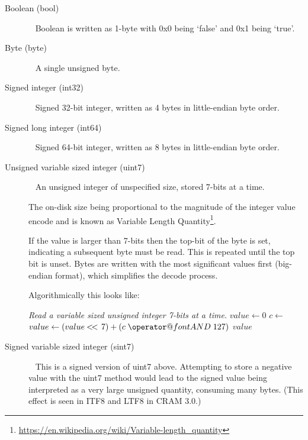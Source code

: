 \documentclass[a4paper]{article}
\makeatletter
\newcommand*{\bitand}{%
  \nonscript\mskip-\medmuskip\mkern5mu%
  \mathbin{\operator@font AND}\penalty900\mkern5mu%
  \nonscript\mskip-\medmuskip
}
\newcommand\shiftl{\mathbin{<\mkern-3mu<\,}}
\makeatother
\begin{document}
\begin{description}

\item[Boolean (bool)]\ \newline
Boolean is written as 1-byte with 0x0 being `false' and 0x1 being `true'.

\item[Byte (byte)]\ \newline
A single unsigned byte.

\item[Signed integer (int32)]\ \newline
Signed 32-bit integer, written as 4 bytes in little-endian byte order.

\item[Signed long integer (int64)]\ \newline
Signed 64-bit integer, written as 8 bytes in little-endian byte order.

\item[Unsigned variable sized integer (uint7)]\ \newline
An unsigned integer of unspecified size, stored 7-bits at a time.

The on-disk size being proportional to the magnitude of the integer
value encode and is known as Variable Length
Quantity\footnote{\url{https://en.wikipedia.org/wiki/Variable-length_quantity}}.

If the value is larger than 7-bits then the top-bit of the byte is
set, indicating a subsequent byte must be read.  This is repeated
until the top bit is unset. Bytes are written with the most
significant values first (big-endian format), which simplifies the
decode process.

Algorithmically this looks like:

\begin{algorithmic}[1]
\Statex
\Statex \textit{Read a variable sized unsigned integer 7-bits at a time.}
  \State $value \gets 0$
  \Repeat
    \State $c \gets$ 
    \State $value \gets (value \shiftl 7) + (c \bitand 127)$
  \State \Return $value$
  \EndFunction
\end{algorithmic}


\item[Signed variable sized integer (sint7)]\ \newline
This is a signed version of uint7 above.  Attempting to store a
negative value with the uint7 method would lead to the signed value
being interpreted as a very large unsigned quantity, consuming many
bytes.  (This effect is seen in ITF8 and LTF8 in CRAM 3.0.)


\end{description}
\end{document}
